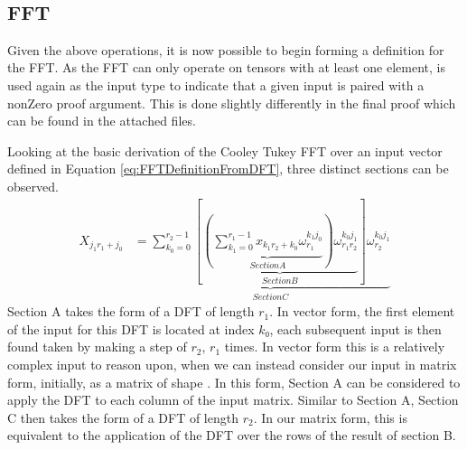 \begin{code}
\AgdaSpace{}%
\AgdaSymbol{)}\AgdaSpace{}%
\AgdaSpace{}%
\AgdaSpace{}%
\AgdaSpace{}%
\AgdaSymbol{(}\AgdaSpace{}%
\AgdaSpace{}%
\AgdaSymbol{)}\AgdaSpace{}%
\<%
\\
%
\>[2]\AgdaSpace{}%
\AgdaSpace{}%
\AgdaSpace{}%
\AgdaSymbol{=}\AgdaSpace{}%
\AgdaSpace{}%
\AgdaSymbol{(}\AgdaSpace{}%
\AgdaSpace{}%
\AgdaSymbol{(}\AgdaSpace{}%
\AgdaSymbol{))}\<%
\end{code}


\clearpage
\subsection{FFT}
Given the above operations, it is now possible to begin forming a definition for
the FFT.
As the FFT can only operate on tensors with at least one element,  is used again
as the input type to indicate that a given input is paired with a nonZero proof 
argument.
This is done slightly differently in the final proof which can be found in the
attached files.

Looking at the basic derivation of the Cooley Tukey FFT over an input vector
defined in Equation \ref{eq:FFTDefinitionFromDFT}, three distinct sections can
be observed.
\begin{align}
    X_{j_1r_1+j_0}
      &=\underbrace{\sum^{r_2-1}_{k_0=0}{
        \left[
          \underbrace{
            \left(
              \underbrace{
                \sum^{r_1-1}_{k_1=0}x_{k_1r_2+k_0}\omega_{r_1}^{k_1j_0}
              }_{Section A} \right
            ) \omega_{r_1r_2}^{k_0j_1}
          }_{Section B}
        \right]
        \omega_{r_2}^{k_0j_1}
      }}_{Section C}
    \label{eq:FFTDefinitionLabeled}
\end{align}
Section A takes the form of a DFT of length $r_1$.
In vector form, the first element of the input for this DFT is located at index $k₀$, 
each subsequent input is then found taken by making a step of $r_2$, $r_1$ times.
In vector form this is a relatively complex input to reason upon, when we can 
instead consider our input in matrix form, initially, as a matrix of shape .
In this form, Section A can be considered to apply the DFT to each column of the
input matrix.
Similar to Section A, Section C then takes the form of a DFT of length $r_2$.
In our  matrix form, this is equivalent to the application of 
the DFT over the rows of the result of section B.

